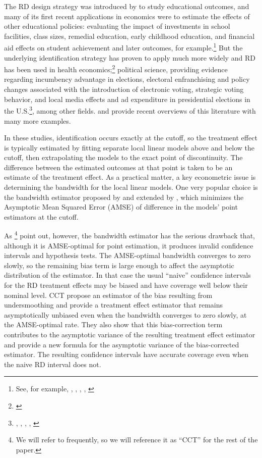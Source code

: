 \documentclass[12pt,fleqn]{article}
\begin{document}
The RD design strategy was introduced by \cite{thistlethwaite1960} to study
educational outcomes, and many of its first recent applications in economics
were to estimate the effects of other educational policies: evaluating the
impact of investments in school facilities, class sizes, remedial education,
early childhood education, and financial aid effects on student achievement and
later outcomes, for example.\footnote{%
  See, for example, \cite{vdk2002}, \cite{jacoblefgren2004}, \cite{ludwig2007},
  \cite{urquiola2009}, \cite{cellini2010}} %
But the underlying identification strategy has proven to apply much more widely
and RD has been used in health economics;\footnote{%
  \cite{Card2009,barreca2011saving}} %
political science, providing evidence regarding incumbency advantage in
elections, electoral enfranchising and policy changes associated with the
introduction of electronic voting, strategic voting behavior, and local media
effects and ad expenditure in presidential elections in the U.S.\footnote{%
  \cite{lee2008}, \cite{Caughey2011}, \cite{keele2014geographic},
  \cite{erikson2015}, \cite{Fujiwara2011,Fujiwara2015}}, %
among other fields. \cite{imbens2008} and \cite{lee2010} provide recent
overviews of this literature with many more examples.

In these studies, identification occurs exactly at the cutoff, so the
treatment effect is typically estimated by fitting separate local linear models
above and below the cutoff, then extrapolating the models to the exact point of
discontinuity. The difference between the estimated outcomes at that point is
taken to be an estimate of the treatment effect. As a practical matter, a key
econometric issue is determining the bandwidth for the local linear models.  One
very popular choice is the bandwidth estimator proposed by \cite{IK} and
extended by \cite{calonico2014}, which minimizes the Asymptotic Mean Squared
Error (AMSE) of difference in the models' point estimators at the cutoff.

As \cite{calonico2014}\footnote{%
  We will refer to \cite{calonico2014} frequently, so we will reference it as
  ``CCT'' for the rest of the paper.} %
point out, however, the \cite{IK} bandwidth estimator has the serious drawback
that, although it is AMSE-optimal for point estimation, it produces invalid
confidence intervals and hypothesis tests. The AMSE-optimal bandwidth
converges to zero slowly, so the remaining bias term is large enough to affect
the asymptotic distribution of the estimator. In that case the usual ``naive''
confidence intervals for the RD treatment effects may be biased and have
coverage well below their nominal level.
CCT propose an estimator of the bias resulting from undersmoothing and provide a
treatment effect estimator that remains asymptotically unbiased even when the
bandwidth converges to zero slowly, at the AMSE-optimal rate. They also show
that this bias-correction term contributes to the asymptotic variance of the
resulting treatment effect estimator and provide a new formula for the
asymptotic variance of the bias-corrected estimator. The resulting confidence
intervals have accurate coverage even when the naive RD interval does not.
\end{document}
